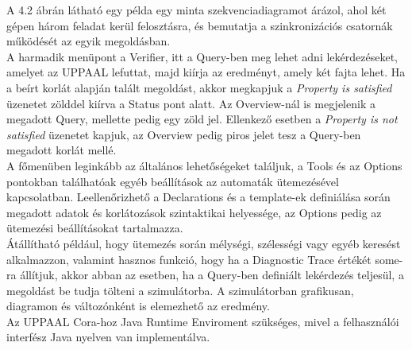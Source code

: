 \documentclass {report}
\begin{document}
A 4.2 ábrán látható egy példa egy minta szekvenciadiagramot árázol, ahol két gépen három feladat kerül felosztásra, és bemutatja a szinkronizációs csatornák működését az egyik megoldásban.\\
A harmadik menüpont a Verifier, itt a Query-ben meg lehet adni lekérdezéseket, amelyet az UPPAAL lefuttat, majd kiírja az eredményt, amely két fajta lehet. Ha a beírt korlát alapján talált megoldást, akkor megkapjuk a \emph{Property is satisfied} üzenetet zölddel kiírva a Status pont alatt. Az Overview-nál is megjelenik a megadott Query, mellette pedig egy zöld jel. Ellenkező esetben a \emph{Property is not satisfied} üzenetet kapjuk, az Overview pedig piros jelet tesz a Query-ben megadott korlát mellé.    \\
A főmenüben leginkább az általános lehetőségeket találjuk, a Tools és az Options pontokban találhatóak egyéb beállítások az automaták ütemezésével kapcsolatban. Leellenőrizhető a Declarations és a template-ek definiálása során megadott adatok és korlátozások szintaktikai helyessége, az Options pedig az ütemezési beállításokat tartalmazza. \\
Átállítható például, hogy ütemezés során mélységi, szélességi vagy egyéb keresést alkalmazzon, valamint hasznos funkció, hogy ha a Diagnostic Trace értékét some-ra állítjuk, akkor abban az esetben, ha a Query-ben definiált lekérdezés teljesül, a megoldást be tudja tölteni a szimulátorba. A szimulátorban grafikusan, diagramon és változónként is elemezhető az eredmény. \\
Az UPPAAL Cora-hoz Java Runtime Enviroment szükséges, mivel a felhasználói interfész Java nyelven van implementálva.
\end{document}
